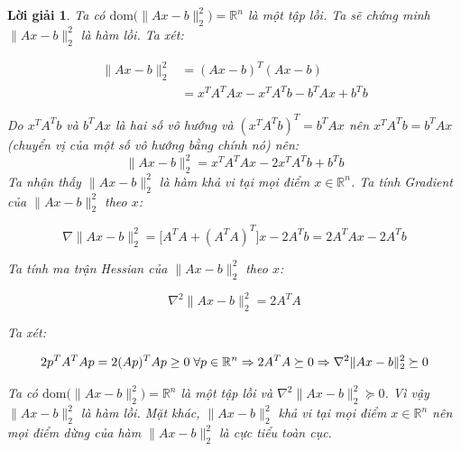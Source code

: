 \documentclass[14pt, a4paper]{article}
\theoremstyle{sltheorem}
\theoremstyle{soltheorem}
\newtheorem*{loigiai}{Lời giải}
\begin{document}
    \begin{loigiai}
        Ta có $\mathrm{dom}\Big( \lVert Ax-b \rVert_2^2\Big)=\mathbb{R}^{n}$ là một tập lồi. Ta sẽ chứng minh
        $\lVert Ax - b \rVert_2^2$ là hàm lồi. Ta xét:

        \begin{equation*}
            \begin{aligned}
            \lVert Ax - b \rVert_2^2&=(Ax-b)^T(Ax-b)\\
            &=x^TA^TAx - x^TA^Tb - b^TAx + b^Tb
            \end{aligned}
        \end{equation*}

        Do $x^TA^Tb$ và $b^TAx$ là hai số vô hướng và $(x^TA^Tb)^T=b^TAx$ nên $x^TA^Tb=b^TAx$ (chuyển vị của một số vô hướng bằng chính nó) nên:
        \begin{equation*}
            \lVert Ax - b \rVert_2^2=x^TA^TAx - 2x^TA^Tb + b^Tb
        \end{equation*}
        Ta nhận thấy $\lVert Ax - b \rVert_2^2$ là hàm khả vi tại mọi điểm $x \in \mathbb{R}^n$. Ta tính Gradient của $\lVert Ax - b \rVert_2^2$ theo $x$:

        \begin{equation*}
            \nabla \lVert Ax - b \rVert_2^2=\Big\lbrack A^TA + (A^TA)^T \Big\rbrack x-2A^Tb=2A^TAx - 2A^Tb
        \end{equation*}

        Ta tính ma trận Hessian của $\lVert Ax - b \rVert_2^2$ theo $x$:

        \begin{equation*}
            \nabla^2 \lVert Ax - b \rVert_2^2=2A^TA
        \end{equation*}

        Ta xét:

        \begin{equation*}
            2p^TA^TAp=2(Ap)^TAp\geq0 \thickspace \forall p \in \mathbb{R}^{n} \Rightarrow 2A^TA \succeq 0 \Rightarrow \nabla^2 \lVert Ax - b \rVert_2^2 \succeq 0
        \end{equation*}

        Ta có $\mathrm{dom}\Big( \lVert Ax-b \rVert_2^2\Big)=\mathbb{R}^{n}$ là một tập lồi và $\nabla^2 \lVert Ax - b \rVert_2^2 \succeq 0$. Vì vậy $\lVert Ax - b \rVert_2^2$ là hàm lồi. Mặt khác, $\lVert Ax - b \rVert_2^2$ khả vi tại mọi điểm $x \in \mathbb{R}^{n}$ nên mọi điểm dừng của hàm $\lVert Ax - b \rVert_2^2$ là cực tiểu toàn cục.


\end{loigiai}
\end{document}
